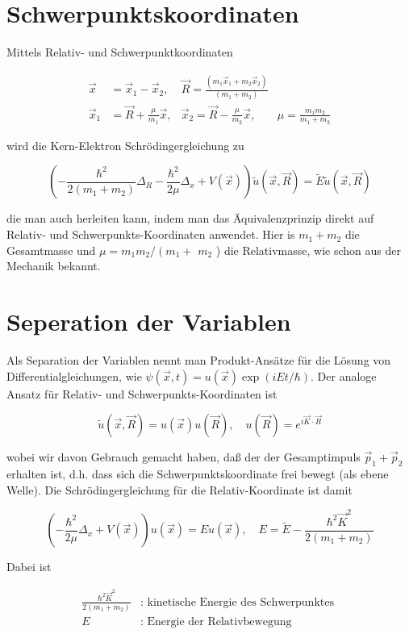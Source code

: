 \documentclass[10pt, letterpaper]{article}
\begin{document}
\section*{Schwerpunktskoordinaten}
Mittels Relativ- und Schwerpunktkoordinaten

$$
\begin{aligned}
\vec{x} & =\vec{x}_{1}-\vec{x}_{2}, & \vec{R}=\frac{\left(m_{1} \vec{x}_{1}+m_{2} \vec{x}_{2}\right)}{\left(m_{1}+m_{2}\right)} & \\
\vec{x}_{1} & =\vec{R}+\frac{\mu}{m_{1}} \vec{x}, & \vec{x}_{2}=\vec{R}-\frac{\mu}{m_{2}} \vec{x}, & \mu=\frac{m_{1} m_{2}}{m_{1}+m_{2}}
\end{aligned}
$$

wird die Kern-Elektron Schrödingergleichung zu

$$
\left(-\frac{\hbar^{2}}{2\left(m_{1}+m_{2}\right)} \Delta_{R}-\frac{\hbar^{2}}{2 \mu} \Delta_{x}+V(\vec{x})\right) \tilde{u}(\vec{x}, \vec{R})=\tilde{E} \tilde{u}(\vec{x}, \vec{R})
$$

die man auch herleiten kann, indem man das Äquivalenzprinzip direkt auf Relativ- und Schwerpunkts-Koordinaten anwendet. Hier is $m_{1}+m_{2}$ die Gesamtmasse und $\mu=m_{1} m_{2} /\left(m_{1}+\right.$ $m_{2}$ ) die Relativmasse, wie schon aus der Mechanik bekannt.

\section*{Seperation der Variablen}
Als Separation der Variablen nennt man Produkt-Ansätze für die Lösung von Differentialgleichungen, wie $\psi(\vec{x}, t)=u(\vec{x}) \exp (i E t / \hbar)$. Der analoge Ansatz für Relativ- und Schwerpunkts-Koordinaten ist

$$
\tilde{u}(\vec{x}, \vec{R})=u(\vec{x}) u(\vec{R}), \quad u(\vec{R})=e^{i \vec{K} \cdot \vec{R}}
$$

wobei wir davon Gebrauch gemacht haben, daß der der Gesamptimpuls $\vec{p}_{1}+\vec{p}_{2}$ erhalten ist, d.h. dass sich die Schwerpunktskoordinate frei bewegt (als ebene Welle). Die Schrödingergleichung für die Relativ-Koordinate ist damit

$$
\left(-\frac{\hbar^{2}}{2 \mu} \Delta_{x}+V(\vec{x})\right) u(\vec{x})=E u(\vec{x}), \quad E=\tilde{E}-\frac{\hbar^{2} \vec{K}^{2}}{2\left(m_{1}+m_{2}\right)}
$$

Dabei ist

$$
\begin{aligned}
\frac{\hbar^{2} \vec{K}^{2}}{2\left(m_{1}+m_{2}\right)} & : \text { kinetische Energie des Schwerpunktes } \\
E & : \text { Energie der Relativbewegung }
\end{aligned}
$$
\end{document}
